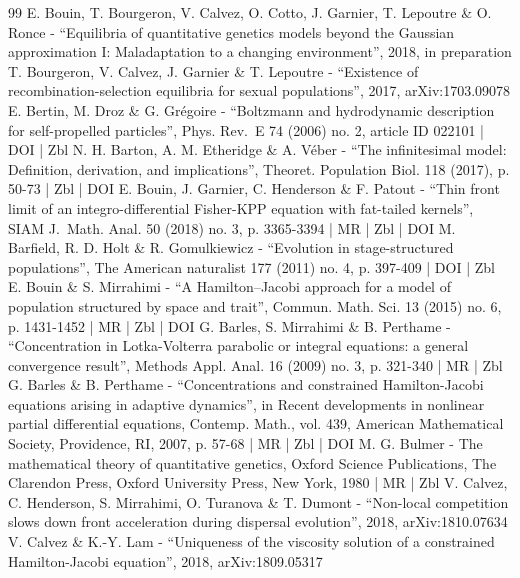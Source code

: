 \begin{thebibliography}{99}
E. Bouin, T. Bourgeron, V. Calvez, O. Cotto, J. Garnier, T. Lepoutre \& O. Ronce - “Equilibria of quantitative genetics models beyond the Gaussian approximation I: Maladaptation to a changing environment”, 2018, in preparation
T. Bourgeron, V. Calvez, J. Garnier \& T. Lepoutre - “Existence of recombination-selection equilibria for sexual populations”, 2017, arXiv:1703.09078
E. Bertin, M. Droz \& G. Grégoire - “Boltzmann and hydrodynamic description for self-propelled particles”, Phys. Rev. E 74 (2006) no. 2, article ID 022101 | DOI | Zbl
N. H. Barton, A. M. Etheridge \& A. Véber - “The infinitesimal model: Definition, derivation, and implications”, Theoret. Population Biol. 118 (2017), p. 50-73 | Zbl | DOI
E. Bouin, J. Garnier, C. Henderson \& F. Patout - “Thin front limit of an integro-differential Fisher-KPP equation with fat-tailed kernels”, SIAM J. Math. Anal. 50 (2018) no. 3, p. 3365-3394 | MR | Zbl | DOI
M. Barfield, R. D. Holt \& R. Gomulkiewicz - “Evolution in stage-structured populations”, The American naturalist 177 (2011) no. 4, p. 397-409 | DOI | Zbl
E. Bouin \& S. Mirrahimi - “A Hamilton–Jacobi approach for a model of population structured by space and trait”, Commun. Math. Sci. 13 (2015) no. 6, p. 1431-1452 | MR | Zbl | DOI
G. Barles, S. Mirrahimi \& B. Perthame - “Concentration in Lotka-Volterra parabolic or integral equations: a general convergence result”, Methods Appl. Anal. 16 (2009) no. 3, p. 321-340 | MR | Zbl
G. Barles \& B. Perthame - “Concentrations and constrained Hamilton-Jacobi equations arising in adaptive dynamics”, in Recent developments in nonlinear partial differential equations, Contemp. Math., vol. 439, American Mathematical Society, Providence, RI, 2007, p. 57-68 | MR | Zbl | DOI
M. G. Bulmer - The mathematical theory of quantitative genetics, Oxford Science Publications, The Clarendon Press, Oxford University Press, New York, 1980 | MR | Zbl
V. Calvez, C. Henderson, S. Mirrahimi, O. Turanova \& T. Dumont - “Non-local competition slows down front acceleration during dispersal evolution”, 2018, arXiv:1810.07634
V. Calvez \& K.-Y. Lam - “Uniqueness of the viscosity solution of a constrained Hamilton-Jacobi equation”, 2018, arXiv:1809.05317

\end{thebibliography}
